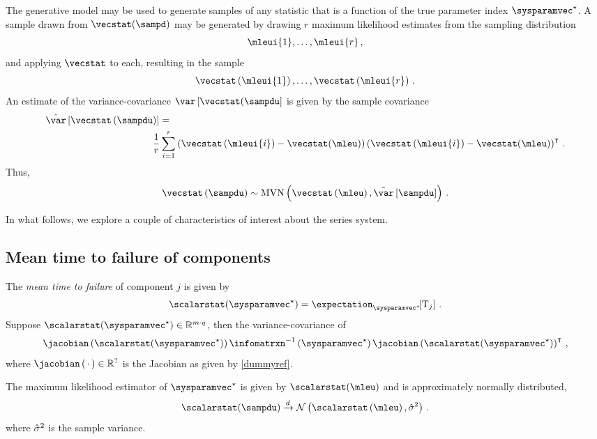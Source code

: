 \documentclass[../main.tex]{subfiles}
\begin{document}
The generative model may be used to generate samples of any statistic that is a function of the true parameter index $\tparam\sysparamvec$. A sample drawn from $\vecstat(\sampd)$ may be generated by drawing $r$ maximum likelihood estimates from the sampling distribution
\begin{equation}
    \mleui{1}, \ldots, \mleui{r}\,,
\end{equation}
and applying $\vecstat$ to each, resulting in the sample
\begin{equation}
\label{eq:phi_sample}
    \vecstat\left(\mleui{1}\right),
    \ldots,
    \vecstat\left(\mleui{r}\right)\,.
\end{equation}
An estimate of the variance-covariance $\var\left[\vecstat(\sampdu\right]$ is given by the sample covariance
\begin{equation}
\begin{split}
    \estimator{\var}\left[\vecstat\left(\sampdu\right)\right] &=\\
    & \!\!\!\! \frac{1}{r} \sum_{i=1}^{r}
            \left(\vecstat\left(\mleui{i}\right) - \vecstat(\mleu)\right)
            \left(\vecstat\left(\mleui{i}\right) - \vecstat(\mleu)\right)^\intercal\,.
\end{split}
\end{equation}
Thus,
\begin{equation}
    \vecstat\left(\sampdu\right) \sim \mvn\left(\vecstat\left(\mleu\right), \estimator{\var}\left[\sampdu\right] \right)\,.
\end{equation}

In what follows, we explore a couple of characteristics of interest about the series system.
\subsection{Mean time to failure of components}
The \emph{mean time to failure} of component $j$ is given by
\begin{equation}
    \scalarstat(\tparam\sysparamvec) = \expectation_{\tparam\sysparamvec}\!\! \left[\cv_j\right]\,.
\end{equation}
Suppose $\scalarstat(\tparam\sysparamvec) \in \mathbb{R}^{m \cdot q}$, then the variance-covariance of 
\begin{equation}
    \jacobian\left(\scalarstat(\tparam\sysparamvec)\right) \infomatrxn^{-1}\left(\tparam\sysparamvec\right) \jacobian\left(\scalarstat(\tparam\sysparamvec)\right)^\intercal\,,
\end{equation}
where $\jacobian\left(\,\cdot\,\right) \in \mathbb{R}^{?}$ is the Jacobian as 
given by \cref{dummyref}.

The maximum likelihood estimator of $\tparam\sysparamvec$ is given by $\scalarstat(\mleu)$ and is approximately normally distributed,
\begin{equation}
\scalarstat(\sampdu) \xrightarrow{d} \mathcal{N}\left(\scalarstat\left(\mleu\right), \estimator{\sigma}^2\right)\,.
\end{equation}
where $\hat{\sigma}^2$ is the sample variance.
\end{document}
